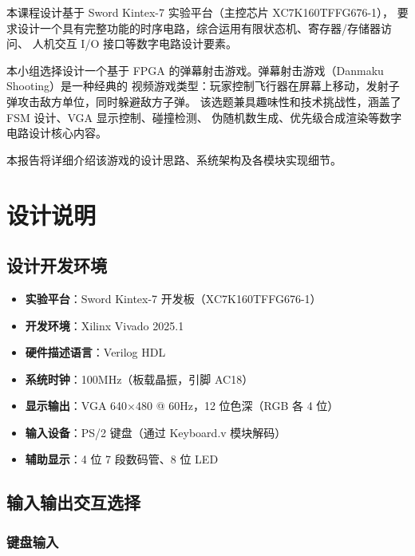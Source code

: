 \documentclass[12pt,a4paper]{ctexart}
\begin{document}
本课程设计基于 Sword Kintex-7 实验平台（主控芯片 XC7K160TFFG676-1），
要求设计一个具有完整功能的时序电路，综合运用有限状态机、寄存器/存储器访问、
人机交互 I/O 接口等数字电路设计要素。

本小组选择设计一个基于 FPGA 的弹幕射击游戏。弹幕射击游戏（Danmaku Shooting）是一种经典的
视频游戏类型：玩家控制飞行器在屏幕上移动，发射子弹攻击敌方单位，同时躲避敌方子弹。
该选题兼具趣味性和技术挑战性，涵盖了 FSM 设计、VGA 显示控制、碰撞检测、
伪随机数生成、优先级合成渲染等数字电路设计核心内容。

本报告将详细介绍该游戏的设计思路、系统架构及各模块实现细节。

\section{设计说明}

\subsection{设计开发环境}

\begin{itemize}
    \item \textbf{实验平台}：Sword Kintex-7 开发板（XC7K160TFFG676-1）
    \item \textbf{开发环境}：Xilinx Vivado 2025.1
    \item \textbf{硬件描述语言}：Verilog HDL
    \item \textbf{系统时钟}：100MHz（板载晶振，引脚 AC18）
    \item \textbf{显示输出}：VGA 640$\times$480 @ 60Hz，12 位色深（RGB 各 4 位）
    \item \textbf{输入设备}：PS/2 键盘（通过 Keyboard.v 模块解码）
    \item \textbf{辅助显示}：4 位 7 段数码管、8 位 LED
\end{itemize}

\subsection{输入输出交互选择}

\subsubsection{键盘输入}
\end{document}
